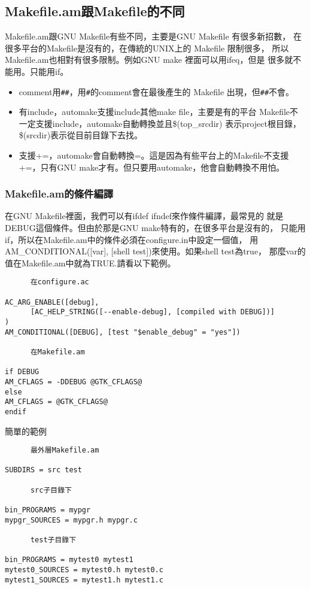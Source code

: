     \subsection{Makefile.am跟Makefile的不同}
    Makefile.am跟GNU Makefile有些不同，主要是GNU Makefile 有很多新招數，
    在很多平台的Makefile是沒有的，在傳統的UNIX上的 Makefile 限制很多，
    所以Makefile.am也相對有很多限制。例如GNU make 裡面可以用ifeq，但是
    很多就不能用。只能用if。
    \begin{itemize}
      \item comment用\verb=##=，用\verb=#=的comment會在最後產生的 Makefile
        出現，但\verb=##=不會。
      \item 有include，automake支援include其他make file，主要是有的平台
        Makefile不一定支援include，automake自動轉換並且\$(top\_srcdir)
        表示project根目錄，\$(srcdir)表示從目前目錄下去找。
      \item 支援+=，automake會自動轉換=。這是因為有些平台上的Makefile不支援
        +=，只有GNU make才有。但只要用automake，他會自動轉換不用怕。
    \end{itemize}

    \subsubsection{Makefile.am的條件編譯}
    在GNU Makefile裡面，我們可以有ifdef ifndef來作條件編譯，最常見的
    就是DEBUG這個條件。但由於那是GNU make特有的，在很多平台是沒有的，
    只能用if，所以在Makefile.am中的條件必須在configure.in中設定一個值，
    用AM\_CONDITIONAL([var], [shell test])來使用。如果shell test為true，
    那麼var的值在Makefile.am中就為TRUE.請看以下範例。
    \begin{verbatim}
      在configure.ac
      
AC_ARG_ENABLE([debug],
      [AC_HELP_STRING([--enable-debug], [compiled with DEBUG])]
)
AM_CONDITIONAL([DEBUG], [test "$enable_debug" = "yes"])
      
      在Makefile.am
      
if DEBUG
AM_CFLAGS = -DDEBUG @GTK_CFLAGS@
else
AM_CFLAGS = @GTK_CFLAGS@
endif
    \end{verbatim}
      簡單的範例
    \begin{verbatim}
      最外層Makefile.am
      
SUBDIRS = src test
      
      src子目錄下
      
bin_PROGRAMS = mypgr
mypgr_SOURCES = mypgr.h mypgr.c
      
      test子目錄下
      
bin_PROGRAMS = mytest0 mytest1
mytest0_SOURCES = mytest0.h mytest0.c
mytest1_SOURCES = mytest1.h mytest1.c
    \end{verbatim}

